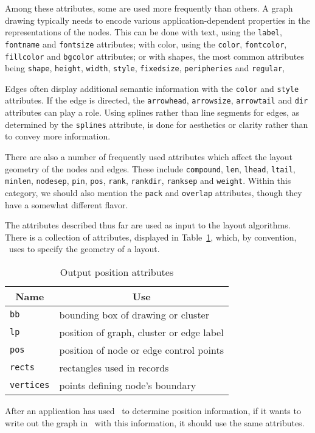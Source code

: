 Among these attributes, some are used more frequently than others.
A graph drawing typically needs to encode various application-dependent
properties in the representations of the nodes. This can be done 
with text, using the {\tt label}, {\tt fontname} and {\tt fontsize} 
attributes; with color, using the {\tt color}, {\tt fontcolor}, 
{\tt fillcolor} and {\tt bgcolor} attributes; or with
shapes, the most common attributes being {\tt shape}, {\tt height},
{\tt width}, {\tt style}, {\tt fixedsize}, {\tt peripheries} and {\tt regular},

Edges often display additional semantic information with the
{\tt color} and {\tt style} attributes. If the edge is directed,
the {\tt arrowhead}, {\tt arrowsize}, {\tt arrowtail} and {\tt dir}
attributes can play a role. Using splines rather than line segments
for edges, as determined by the {\tt splines} attribute, is done
for aesthetics or clarity rather than to convey more information.

There are also a number of frequently used attributes which affect
the layout geometry of the nodes and edges. These include
{\tt compound}, {\tt len}, {\tt lhead}, {\tt ltail}, {\tt minlen},
{\tt nodesep}, {\tt pin}, {\tt pos}, {\tt rank}, {\tt rankdir}, {\tt ranksep}
and {\tt weight}. Within this category, we should also mention the
{\tt pack} and {\tt overlap} attributes, though they have a somewhat
different flavor.

The attributes described thus far are used as input to the layout algorithms.
There is a collection of attributes, displayed in Table~\ref{tab:write}, 
which, by convention, \gviz\ uses to specify the geometry of a layout. 
\begin{table}[htbp]\footnotesize
\centering
\begin{tabular}[t]{|l|p{3.5in}|} \hline
\multicolumn{1}{|c|}{Name} & \multicolumn{1}{c|}{Use} \\ \hline
{\tt bb} &  bounding box of drawing or cluster \\
{\tt lp} & position of graph, cluster or edge label \\
{\tt pos} & position of node or edge control points \\
{\tt rects} & rectangles used in records \\
{\tt vertices} & points defining node's boundary \\
\hline
\end{tabular}
\caption{Output position attributes}
\label{tab:write}
\end{table}
After an application has used \gviz\ to determine position information, 
if it wants to write out the graph in \DOT\ with this information, it should
use the same attributes.
 
